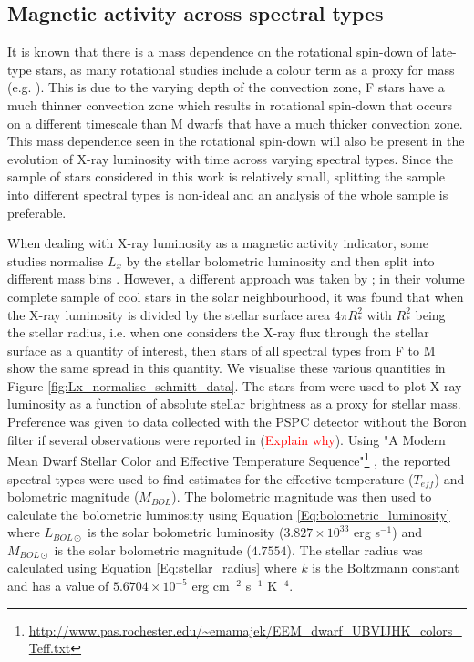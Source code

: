\subsection{Magnetic activity across spectral types}
It is known that there is a mass dependence on the rotational spin-down of late-type stars, as many rotational studies include a colour term as a proxy for mass (e.g. \citealt{Barnes_2003,Barnes_2010,Angus_etal_2015}). This is due to the varying depth of the convection zone, F stars have a much thinner convection zone which results in rotational spin-down that occurs on a different timescale than M dwarfs that have a much thicker convection zone. This mass dependence seen in the rotational spin-down will also be present in the evolution of X-ray luminosity with time across varying spectral types. Since the sample of stars considered in this work is relatively small, splitting the sample into different spectral types is non-ideal and an analysis of the whole sample is preferable.

When dealing with X-ray luminosity as a magnetic activity indicator, some studies normalise $L_{x}$ by the stellar bolometric luminosity and then split into different mass bins \citep{Preibisch_Feigelson_2005,Jackson_etal_2012}. However, a different approach was taken by \citet{Schmitt_Liefke_2004}; in their volume complete sample of cool stars in the solar neighbourhood, it was found that when the X-ray luminosity is divided by the stellar surface area $4\pi R_{*}^{2}$ with $R_{*}^{2}$ being the stellar radius, i.e. when one considers the X-ray flux through the stellar surface as a quantity of interest, then stars of all spectral types from F to M show the same spread in this quantity. We visualise these various quantities in Figure \ref{fig:Lx_normalise_schmitt_data}. The stars from \citet{Schmitt_Liefke_2004} were used to plot X-ray luminosity as a function of absolute stellar brightness as a proxy for stellar mass. Preference was given to data collected with the PSPC detector without the Boron filter if several observations were reported in \citet{Schmitt_Liefke_2004}(\textcolor{red}{Explain why}). Using "A Modern Mean Dwarf Stellar Color and Effective Temperature Sequence"\footnote{\url{http://www.pas.rochester.edu/~emamajek/EEM_dwarf_UBVIJHK_colors_Teff.txt}} \citep{Pecaut_Mamajek_2013}, the reported spectral types \citep{Schmitt_Liefke_2004} were used to find estimates for the effective temperature ($T_{eff}$) and bolometric magnitude ($M_{BOL}$). The bolometric magnitude was then used to calculate the bolometric luminosity using Equation \ref{Eq:bolometric_luminosity} where $L_{BOL\odot}$ is the solar bolometric luminosity ($3.827 \times 10^{33}$ erg s$^{-1}$) and $M_{BOL\odot}$ is the solar bolometric magnitude ($4.7554$). The stellar radius was calculated using Equation \ref{Eq:stellar_radius} where $k$ is the Boltzmann constant and has a value of $5.6704 \times 10^{-5}$ erg cm$^{-2}$ s$^{-1}$ K$^{-4}$. 

